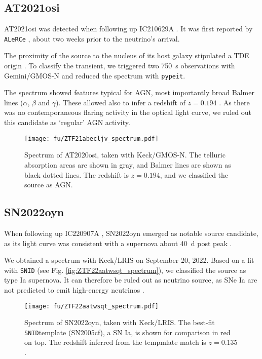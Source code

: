 \subsection{AT2021osi}
AT2021osi was detected when following up IC210629A . It was first reported by \texttt{ALeRCe} , about two weeks prior to the neutrino's arrival. 

The proximity of the source to the nucleus of its host galaxy stipulated a TDE origin . To classify the transient, we triggered two \SI{750}{\second} observations with Gemini/GMOS-N and reduced the spectrum with \texttt{pypeit}.

The spectrum showed features typical for AGN, most importantly broad Balmer lines ($\alpha$, $\beta$ and $\gamma$). These allowed also to infer a redshift of $z=0.194$ . As there was no contemporaneous flaring activity in the optical light curve, we ruled out this candidate as `regular' AGN activity.

\begin{figure}[htb]
    \texttt{[image: fu/ZTF21abecljv\_spectrum.pdf]}
    \caption[AT2020osi spectrum]{Spectrum of AT2020osi, taken with Keck/GMOS-N. The telluric absorption areas are shown in gray, and Balmer lines are shown as black dotted lines. The redshift is $z= 0.194$, and we classified the source as AGN.}
\end{figure}



\subsection{SN2022oyn}
When following up IC220907A , SN2022oyn emerged as notable source candidate, as its light curve was consistent with a supernova about \SI{40}{\day} post peak .

We obtained a spectrum with Keck/LRIS on September 20, 2022. Based on a fit with \texttt{SNID} (see Fig. \ref{fig:ZTF22aatwsqt_spectrum}), we classified the source as type Ia supernova. It can therefore be ruled out as neutrino source, as SNe Ia are not predicted to emit high-energy neutrinos .

\begin{figure}[htb]
    \texttt{[image: fu/ZTF22aatwsqt\_spectrum.pdf]}
    \caption[SN2022oyn spectrum]{Spectrum of SN2022oyn, taken with Keck/LRIS. The best-fit \texttt{SNID}template (SN2005cf), a SN Ia, is shown for comparison in red on top. The redshift inferred from the tempmlate match is $z=0.135$.}
\end{figure}

